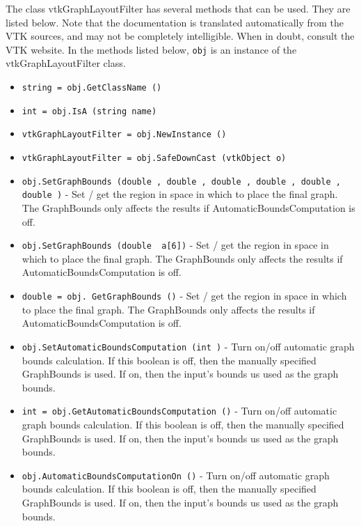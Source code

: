 The class vtkGraphLayoutFilter has several methods that can be used.
  They are listed below.
Note that the documentation is translated automatically from the VTK sources,
and may not be completely intelligible.  When in doubt, consult the VTK website.
In the methods listed below, \verb|obj| is an instance of the vtkGraphLayoutFilter class.
\begin{itemize}
\item  \verb|string = obj.GetClassName ()|

\item  \verb|int = obj.IsA (string name)|

\item  \verb|vtkGraphLayoutFilter = obj.NewInstance ()|

\item  \verb|vtkGraphLayoutFilter = obj.SafeDownCast (vtkObject o)|

\item  \verb|obj.SetGraphBounds (double , double , double , double , double , double )| -  Set / get the region in space in which to place the final graph.
 The GraphBounds only affects the results if AutomaticBoundsComputation
 is off.

\item  \verb|obj.SetGraphBounds (double  a[6])| -  Set / get the region in space in which to place the final graph.
 The GraphBounds only affects the results if AutomaticBoundsComputation
 is off.

\item  \verb|double = obj. GetGraphBounds ()| -  Set / get the region in space in which to place the final graph.
 The GraphBounds only affects the results if AutomaticBoundsComputation
 is off.

\item  \verb|obj.SetAutomaticBoundsComputation (int )| -  Turn on/off automatic graph bounds calculation. If this
 boolean is off, then the manually specified GraphBounds is used.
 If on, then the input's bounds us used as the graph bounds.

\item  \verb|int = obj.GetAutomaticBoundsComputation ()| -  Turn on/off automatic graph bounds calculation. If this
 boolean is off, then the manually specified GraphBounds is used.
 If on, then the input's bounds us used as the graph bounds.

\item  \verb|obj.AutomaticBoundsComputationOn ()| -  Turn on/off automatic graph bounds calculation. If this
 boolean is off, then the manually specified GraphBounds is used.
 If on, then the input's bounds us used as the graph bounds.


\end{itemize}
